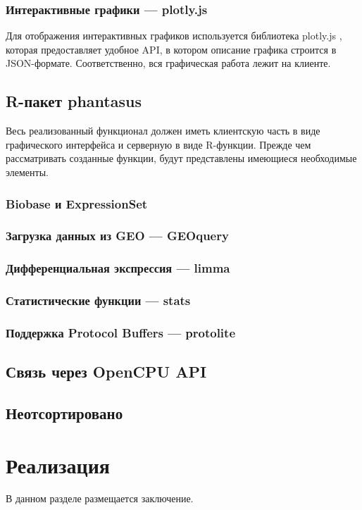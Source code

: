 \documentclass[specification,annotation]{itmo-student-thesis}
\begin{document}
\subsection{Интерактивные графики --- plotly.js}
Для отображения интерактивных графиков используется библиотека plotly.js \cite{plotly}, которая предоставляет удобное API, в котором описание графика строится в JSON-формате. Соответственно, вся графическая работа лежит на клиенте.

\section{R-пакет phantasus}
Весь реализованный функционал должен иметь клиентскую часть в виде графического интерфейса и серверную в виде R-функции.
Прежде чем рассматривать созданные функции, будут представлены имеющиеся необходимые элементы.

\subsection{Biobase и ExpressionSet}

\subsection{Загрузка данных из GEO --- GEOquery}
\subsection{Дифференциальная экспрессия --- limma}
\subsection{Статистические функции --- stats}
\subsection{Поддержка Protocol Buffers --- protolite}

\section{Связь через OpenCPU API}

\section{Неотсортировано}

\chapterconclusion

\chapter{Реализация}

\chapterconclusion

\startconclusionpage

В данном разделе размещается заключение.

\printmainbibliography

\appendix
\end{document}
